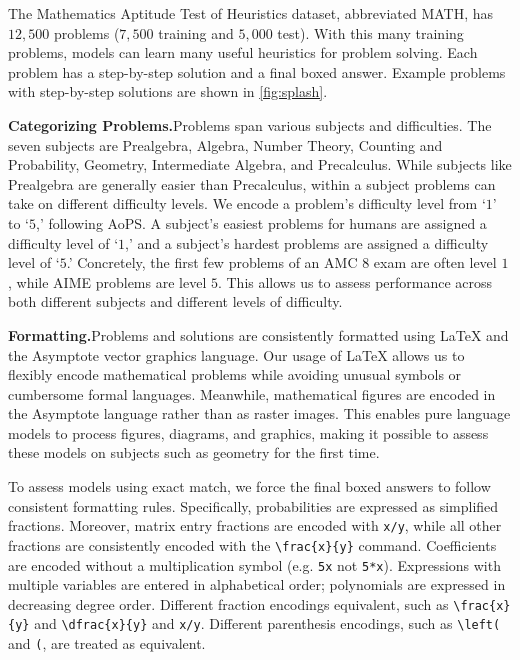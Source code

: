 The Mathematics Aptitude Test of Heuristics dataset, abbreviated MATH, has $12,\!500$ problems ($7,\!500$ training and $5,\!000$ test). With this many training problems, models can learn many useful heuristics for problem solving. Each problem has a step-by-step solution and a final boxed answer. Example problems with step-by-step solutions are shown in \ref{fig:splash}.

\textbf{Categorizing Problems.}\quad Problems span various subjects and difficulties. The seven subjects are Prealgebra, Algebra, Number Theory, Counting and Probability, Geometry, Intermediate Algebra, and Precalculus. While subjects like Prealgebra are generally easier than Precalculus, within a subject problems can take on different difficulty levels. We encode a problem's difficulty level from `$1$' to `$5$,' following AoPS. A subject's easiest problems for humans are assigned a difficulty level of `$1$,' and a subject's hardest problems are assigned a difficulty level of `$5$.' Concretely, the first few problems of an AMC 8 exam are often level $1$, while AIME problems are level $5$. This allows us to assess performance across both different subjects and different levels of difficulty.

\textbf{Formatting.}\quad Problems and solutions are consistently formatted using \LaTeX{} and the Asymptote vector graphics language. Our usage of \LaTeX{} allows us to flexibly encode mathematical problems while avoiding unusual symbols or cumbersome formal languages. Meanwhile, mathematical figures are encoded in the Asymptote language rather than as raster images. This enables pure language models to process figures, diagrams, and graphics, making it possible to assess these models on subjects such as geometry for the first time. 

To assess models using exact match, we force the final boxed answers to follow consistent formatting rules. Specifically, probabilities are expressed as simplified fractions. Moreover, matrix entry fractions are encoded with \verb|x/y|, while all other fractions are consistently encoded with the \verb|\frac{x}{y}| command. Coefficients are encoded without a multiplication symbol (e.g. \verb|5x| not \verb|5*x|). Expressions with multiple variables are entered in alphabetical order; polynomials are expressed in decreasing degree order. Different fraction encodings equivalent, such as \texttt{\textbackslash frac\{x\}\{y\}} and \texttt{\textbackslash dfrac\{x\}\{y\}} and \texttt{x/y}. Different parenthesis encodings, such as \texttt{\textbackslash left(} and \texttt{(}, are treated as equivalent.

